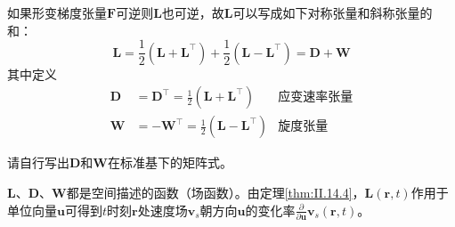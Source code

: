 \documentclass[main.tex]{subfiles}
\begin{document}
如果形变梯度张量$\mathbf{F}$可逆则$\mathbf{L}$也可逆，故$\mathbf{L}$可以写成如下对称张量和斜称张量的和：
\[\mathbf{L}=\frac{1}{2}\left(\mathbf{L}+\mathbf{L}^\intercal\right)+\frac{1}{2}\left(\mathbf{L}-\mathbf{L}^\intercal\right)=\mathbf{D}+\mathbf{W}\]
其中定义
\begin{align*}
    \mathbf{D}&=\mathbf{D}^\intercal=\frac{1}{2}\left(\mathbf{L}+\mathbf{L}^\intercal\right)&\text{应变速率张量}\\
    \mathbf{W}&=-\mathbf{W}^\intercal=\frac{1}{2}\left(\mathbf{L}-\mathbf{L}^\intercal\right)&\text{旋度张量}
\end{align*}

\begin{example}
请自行写出$\mathbf{D}$和$\mathbf{W}$在标准基下的矩阵式。
\end{example}

$\mathbf{L}$、$\mathbf{D}$、$\mathbf{W}$都是空间描述的函数（场函数）。由定理\ref{thm:II.14.4}，$\mathbf{L}\left(\mathbf{r},t\right)$作用于单位向量$\mathbf{u}$可得到$t$时刻$\mathbf{r}$处速度场$\mathbf{v}_s$朝方向$\mathbf{u}$的变化率$\frac{\partial }{\partial \mathbf{u}}\mathbf{v}_s\left(\mathbf{r},t\right)$。
\end{document}
